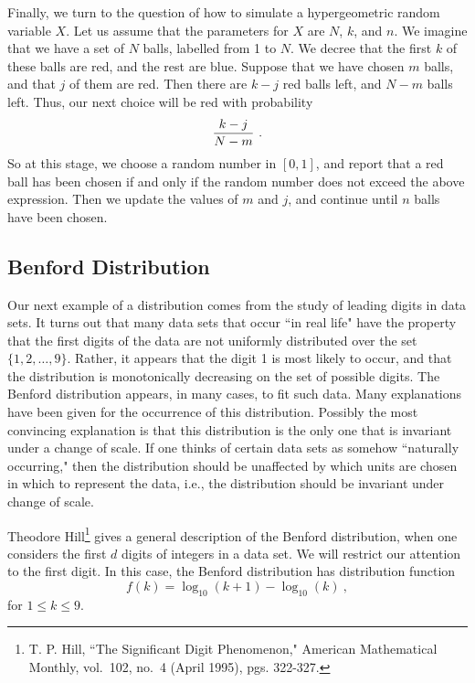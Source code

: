 \par
Finally, we turn to the question of how to simulate a hypergeometric random
variable $X$.  Let us assume that the parameters for $X$ are $N$, $k$, and $n$.  We
imagine that we have a set of $N$ balls, labelled from 1 to $N$.  We decree that the
first $k$ of these balls are red, and the rest are blue.  Suppose that we have chosen
$m$ balls, and that $j$ of them are red.  Then there are $k-j$ red balls left, and
$N-m$ balls left.  Thus, our next choice will be red with probability
$${{k-j}\over{N-m}}\ .$$ So at this stage, we choose a random number in $[0, 1]$, and
report that a red ball has been chosen if and only if the random number does not
exceed the above expression.  Then we update the values of $m$ and $j$, and continue
until $n$ balls have been chosen.

\subsection*{Benford Distribution}
Our next example of a distribution comes from the study of leading digits in data sets.
It turns out that many data sets that occur ``in real life" have the property that
the first digits of the data are not uniformly distributed over the set $\{1, 2, \ldots, 9\}$.
Rather, it appears that the digit 1 is most likely to occur, and that the distribution is
monotonically decreasing on the set of possible digits.  The Benford distribution appears, in many 
cases, to fit such data.  Many explanations have been given for the occurrence of this distribution. 
Possibly the most convincing explanation is that this distribution is the only one that is invariant
under a change of scale.  If one thinks of certain data sets as somehow ``naturally occurring,"
then the distribution should be unaffected by which units are chosen in which to represent the
data,  i.e., the distribution should be invariant under change of scale.
\par
Theodore Hill\footnote{T. P. Hill, ``The Significant Digit Phenomenon," \emx
{American Mathematical Monthly,} vol.\ 102, no.\ 4 (April 1995), pgs. 322-327.} gives a general
description of the Benford distribution, when one considers the first
$d$ digits of integers in a data set.  We will restrict our attention to the first digit.  In this
case, the Benford distribution has distribution function
$$f(k) = \log_{10}(k+1) - \log_{10}(k)\ ,$$
for $1 \le k \le 9$.
\par
